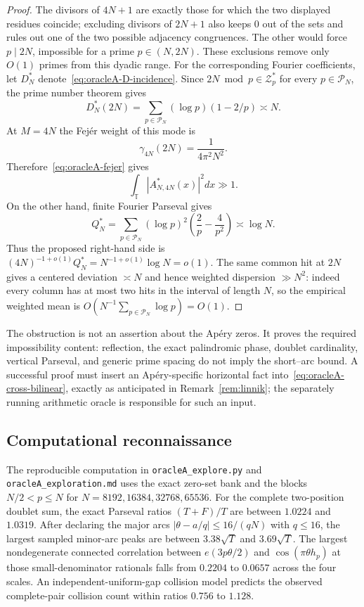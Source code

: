 \begin{proof}
The divisors of $4N+1$ are exactly those for which the two displayed
residues coincide; excluding divisors of $2N+1$ also keeps $0$ out of
the sets and rules out one of the two possible adjacency congruences.
The other would force $p\mid2N$, impossible for a prime $p\in(N,2N)$.
These exclusions remove only $O(1)$ primes from this dyadic range.  For
the corresponding Fourier coefficients, let
$D_N^*$ denote~\eqref{eq:oracleA-D-incidence}.  Since
$2N\bmod p\in\mathcal Z_p^*$ for every $p\in\mathcal P_N$, the prime
number theorem gives
\[
 D_N^*(2N)=\sum_{p\in\mathcal P_N}(\log p)(1-2/p)\asymp N.
\]
At $M=4N$ the Fej\'er weight of this mode is
\[
 \gamma_{4N}(2N)=\frac1{4\pi^2N^2}.
\]
Therefore~\eqref{eq:oracleA-fejer} gives
\[
 \int_{\mathbb T}|A^*_{N,4N}(x)|^2dx\gg1.
\]
On the other hand, finite Fourier Parseval gives
\[
 Q_N^*=\sum_{p\in\mathcal P_N}(\log p)^2
          \left(\frac2p-\frac4{p^2}\right)\asymp\log N.
\]
Thus the proposed right-hand side is
$(4N)^{-1+o(1)}Q_N^*=N^{-1+o(1)}\log N=o(1)$.
The same common hit at $2N$ gives a centered deviation $\asymp N$ and
hence weighted dispersion $\gg N^2$: indeed every column has at most two
hits in the interval of length $N$, so the empirical weighted mean is
$O(N^{-1}\sum_{p\in\mathcal P_N}\log p)=O(1)$.
\end{proof}

The obstruction is not an assertion about the Ap\'ery zeros.  It proves
the required impossibility content: reflection, the exact palindromic
phase, doublet cardinality, vertical Parseval, and generic prime spacing
do not imply the short--arc bound.  A successful proof must insert an
Ap\'ery-specific horizontal fact into~\eqref{eq:oracleA-cross-bilinear},
exactly as anticipated in Remark~\ref{rem:linnik}; the separately running
arithmetic oracle is responsible for such an input.

\subsection{Computational reconnaissance}

The reproducible computation in \texttt{oracleA\_explore.py} and
\texttt{oracleA\_exploration.md} uses the exact zero-set bank and the
blocks $N/2<p\leq N$ for
$N=8192,16384,32768,65536$.  For the complete two-position doublet sum,
the exact Parseval ratios $(T+F)/T$ are between $1.0224$ and $1.0319$.
After declaring the major arcs
$|\theta-a/q|\leq16/(qN)$ with $q\leq16$, the largest sampled minor-arc
peaks are between $3.38\sqrt T$ and $3.69\sqrt T$.  The largest
nondegenerate connected correlation between
$e(3p\theta/2)$ and $\cos(\pi\theta h_p)$ at those small-denominator
rationals falls from $0.2204$ to $0.0657$ across the four scales.
An independent-uniform-gap collision model predicts the observed
complete-pair collision count within ratios $0.756$ to $1.128$.

